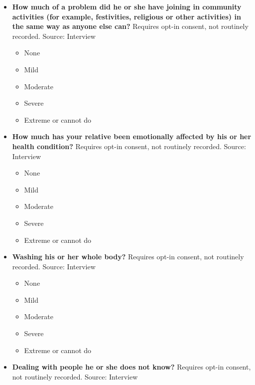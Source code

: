 \documentclass[
]{scrartcl}
\providecommand{\tightlist}{%
  \setlength{\itemsep}{0pt}\setlength{\parskip}{0pt}}\usepackage{longtable,booktabs,array}
\begin{document}
\begin{itemize}
  \begin{itemize}
  \tightlist
  \item
    None
  \item
    Mild
  \item
    Moderate
  \item
    Severe
  \item
    Extreme or cannot do
  \end{itemize}
\item
  \textbf{How much of a problem did he or she have joining in community
  activities (for example, festivities, religious or other activities)
  in the same way as anyone else can?} Requires opt-in consent, not
  routinely recorded. Source: Interview

  \begin{itemize}
  \tightlist
  \item
    None
  \item
    Mild
  \item
    Moderate
  \item
    Severe
  \item
    Extreme or cannot do
  \end{itemize}
\item
  \textbf{How much has your relative been emotionally affected by his or
  her health condition?} Requires opt-in consent, not routinely
  recorded. Source: Interview

  \begin{itemize}
  \tightlist
  \item
    None
  \item
    Mild
  \item
    Moderate
  \item
    Severe
  \item
    Extreme or cannot do
  \end{itemize}
\item
  \textbf{Washing his or her whole body?} Requires opt-in consent, not
  routinely recorded. Source: Interview

  \begin{itemize}
  \tightlist
  \item
    None
  \item
    Mild
  \item
    Moderate
  \item
    Severe
  \item
    Extreme or cannot do
  \end{itemize}
\item
  \textbf{Dealing with people he or she does not know?} Requires opt-in
  consent, not routinely recorded. Source: Interview


\end{itemize}
\end{document}
